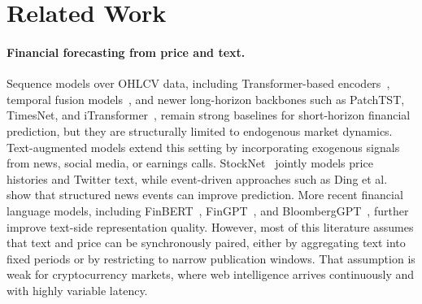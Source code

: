 \section{Related Work}
\label{sec:related}

\paragraph{Financial forecasting from price and text.}
Sequence models over OHLCV data, including Transformer-based encoders~\cite{vaswani2017attention,zhou2021informer,wu2021autoformer}, temporal fusion models~\cite{lim2021tft}, and newer long-horizon backbones such as PatchTST, TimesNet, and iTransformer~\cite{nie2023patchtst,wu2023timesnet,liu2024itransformer}, remain strong baselines for short-horizon financial prediction, but they are structurally limited to endogenous market dynamics.
Text-augmented models extend this setting by incorporating exogenous signals from news, social media, or earnings calls.
StockNet~\cite{xu2018stocknet} jointly models price histories and Twitter text, while event-driven approaches such as Ding et al.~\cite{ding2015deepevent} show that structured news events can improve prediction.
More recent financial language models, including FinBERT~\cite{yang2020finbert}, FinGPT~\cite{lopez2023fingpt}, and BloombergGPT~\cite{wu2023bloomberggpt}, further improve text-side representation quality.
However, most of this literature assumes that text and price can be synchronously paired, either by aggregating text into fixed periods or by restricting to narrow publication windows.
That assumption is weak for cryptocurrency markets, where web intelligence arrives continuously and with highly variable latency.

